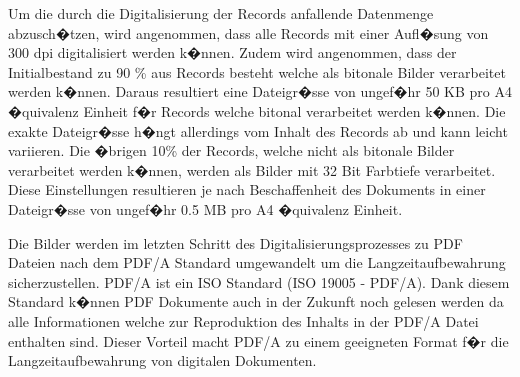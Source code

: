 \documentclass[a4paper,twoside,10pt]{report}
\begin{document}
Um die durch die Digitalisierung der Records anfallende Datenmenge abzusch�tzen, wird angenommen, dass alle Records mit einer Aufl�sung von 300 dpi digitalisiert werden k�nnen. Zudem wird angenommen, dass der Initialbestand zu 90 \% aus Records besteht welche als bitonale Bilder verarbeitet werden k�nnen. Daraus resultiert eine Dateigr�sse von ungef�hr 50 KB pro A4 �quivalenz Einheit f�r Records welche bitonal verarbeitet werden k�nnen. Die exakte Dateigr�sse h�ngt allerdings vom Inhalt des Records ab und kann leicht variieren. Die �brigen 10\% der Records, welche nicht als bitonale Bilder verarbeitet werden k�nnen, werden als Bilder mit 32 Bit Farbtiefe verarbeitet. Diese Einstellungen resultieren je nach Beschaffenheit des Dokuments in einer Dateigr�sse von ungef�hr 0.5 MB pro A4 �quivalenz Einheit.

Die Bilder werden im letzten Schritt des Digitalisierungsprozesses zu PDF Dateien nach dem PDF/A Standard umgewandelt um die Langzeitaufbewahrung sicherzustellen. PDF/A ist ein ISO Standard (ISO 19005 - PDF/A). Dank diesem Standard k�nnen PDF Dokumente auch in der Zukunft noch gelesen werden da alle Informationen welche zur Reproduktion des Inhalts in der PDF/A Datei enthalten sind. Dieser Vorteil macht PDF/A zu einem geeigneten Format f�r die Langzeitaufbewahrung von digitalen Dokumenten. \cite{pdfa} 

\end{document}
